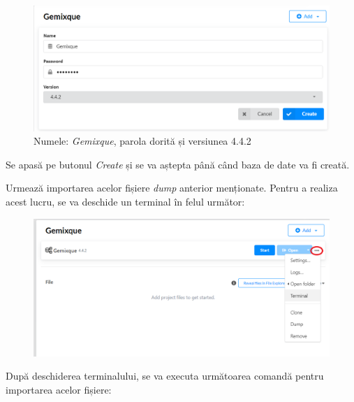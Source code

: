 \documentclass[12pt,a4paper]{report}
\begin{document}
\begin{enumerate}
  \begin{figure}[H]
\centering
\caption{}
\begin{adjustbox}{max size={\textwidth}{\textheight}}
\includegraphics[scale=1]{exemplu_44_add_database}
\end{adjustbox}
\caption*{Numele: \emph{Gemixque}, parola dorită și versiunea 4.4.2}
\end{figure}

  Se apasă pe butonul \emph{Create} și se va aștepta până când baza de date va fi creată.
  
  Urmează importarea acelor fișiere \emph{dump} anterior menționate. Pentru a realiza acest lucru, se va deschide un terminal în felul următor:
  
    \begin{figure}[H]
\centering
\caption{}
\begin{adjustbox}{max size={\textwidth}{\textheight}}
\includegraphics[scale=1]{exemplu_45_terminal}
\end{adjustbox}
\caption*{}
\end{figure}
  
  După deschiderea terminalului, se va executa următoarea comandă pentru importarea acelor fișiere:
  

\end{enumerate}
\end{document}
